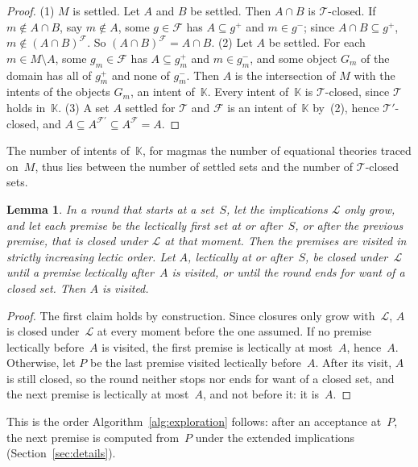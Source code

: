\documentclass[11pt,a4paper]{article}
\newtheorem{lemma}[proposition]{Lemma}
\theoremstyle{definition}
\theoremstyle{remark}
\newcommand{\cl}{\mathcal{L}}
\newcommand{\pos}{^{+}}
\newcommand{\nega}{^{-}}
\begin{document}
\begin{proof}
(1) $M$ is settled. Let $A$ and $B$ be settled. Then $A \cap B$ is $\mathcal{T}$-closed. If $m \notin A \cap B$, say $m \notin A$, some $g \in \mathcal{F}$ has $A \subseteq g\pos$ and $m \in g\nega$; since $A \cap B \subseteq g\pos$, $m \notin (A \cap B)^{\mathcal{F}}$. So $(A \cap B)^{\mathcal{F}} = A \cap B$.
(2) Let $A$ be settled. For each $m \in M \setminus A$, some $g_m \in \mathcal{F}$ has $A \subseteq g_m\pos$ and $m \in g_m\nega$, and some object $G_m$ of the domain has all of $g_m\pos$ and none of $g_m\nega$. Then $A$ is the intersection of $M$ with the intents of the objects $G_m$, an intent of~$\mathbb{K}$. Every intent of~$\mathbb{K}$ is $\mathcal{T}$-closed, since $\mathcal{T}$ holds in~$\mathbb{K}$.
(3) A set $A$ settled for $\mathcal{T}$ and $\mathcal{F}$ is an intent of~$\mathbb{K}$ by~(2), hence $\mathcal{T}'$-closed, and $A \subseteq A^{\mathcal{F}'} \subseteq A^{\mathcal{F}} = A$.
\end{proof}

The number of intents of~$\mathbb{K}$, for magmas the number of equational theories traced on~$M$, thus lies between the number of settled sets and the number of $\mathcal{T}$-closed sets.

\begin{lemma}\label{lem:visits}
In a round that starts at a set~$S$, let the implications $\cl$ only grow, and let each premise be the lectically first set at or after~$S$, or after the previous premise, that is closed under $\cl$ at that moment. Then the premises are visited in strictly increasing lectic order. Let $A$, lectically at or after~$S$, be closed under~$\cl$ until a premise lectically after~$A$ is visited, or until the round ends for want of a closed set. Then $A$ is visited.
\end{lemma}

\begin{proof}
The first claim holds by construction. Since closures only grow with~$\cl$, $A$ is closed under~$\cl$ at every moment before the one assumed. If no premise lectically before~$A$ is visited, the first premise is lectically at most~$A$, hence~$A$. Otherwise, let $P$ be the last premise visited lectically before~$A$. After its visit, $A$ is still closed, so the round neither stops nor ends for want of a closed set, and the next premise is lectically at most~$A$, and not before it: it is~$A$.
\end{proof}

This is the order Algorithm~\ref{alg:exploration} follows: after an acceptance at~$P$, the next premise is computed from~$P$ under the extended implications (Section~\ref{sec:details}).
\end{document}

